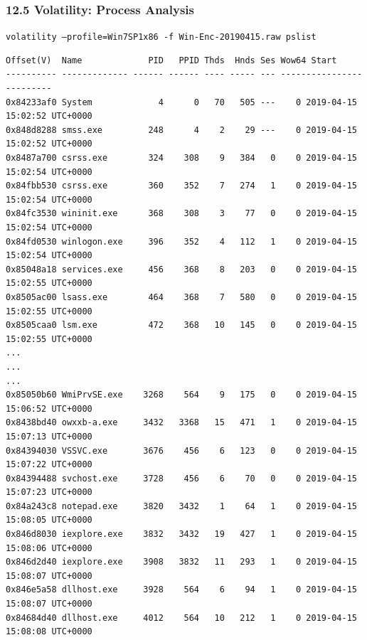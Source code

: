\begin{frame}[fragile]
  \frametitle{12.5 Volatility: Process Analysis}
    \texttt{\footnotesize volatility --profile=Win7SP1x86 -f Win-Enc-20190415.raw pslist}
    \begin{lstlisting}[basicstyle=\tiny]
Offset(V)  Name             PID   PPID Thds  Hnds Ses Wow64 Start          
---------- ------------- ------ ------ ---- ----- --- -------------------------
0x84233af0 System             4      0   70   505 ---    0 2019-04-15 15:02:52 UTC+0000 
0x848d8288 smss.exe         248      4    2    29 ---    0 2019-04-15 15:02:52 UTC+0000
0x8487a700 csrss.exe        324    308    9   384   0    0 2019-04-15 15:02:54 UTC+0000
0x84fbb530 csrss.exe        360    352    7   274   1    0 2019-04-15 15:02:54 UTC+0000
0x84fc3530 wininit.exe      368    308    3    77   0    0 2019-04-15 15:02:54 UTC+0000
0x84fd0530 winlogon.exe     396    352    4   112   1    0 2019-04-15 15:02:54 UTC+0000
0x85048a18 services.exe     456    368    8   203   0    0 2019-04-15 15:02:55 UTC+0000
0x8505ac00 lsass.exe        464    368    7   580   0    0 2019-04-15 15:02:55 UTC+0000
0x8505caa0 lsm.exe          472    368   10   145   0    0 2019-04-15 15:02:55 UTC+0000
...
...
...
0x85050b60 WmiPrvSE.exe    3268    564    9   175   0    0 2019-04-15 15:06:52 UTC+0000
0x8438bd40 owxxb-a.exe     3432   3368   15   471   1    0 2019-04-15 15:07:13 UTC+0000
0x84394030 VSSVC.exe       3676    456    6   123   0    0 2019-04-15 15:07:22 UTC+0000
0x84394488 svchost.exe     3728    456    6    70   0    0 2019-04-15 15:07:23 UTC+0000
0x84a243c8 notepad.exe     3820   3432    1    64   1    0 2019-04-15 15:08:05 UTC+0000
0x846d8030 iexplore.exe    3832   3432   19   427   1    0 2019-04-15 15:08:06 UTC+0000
0x846d2d40 iexplore.exe    3908   3832   11   293   1    0 2019-04-15 15:08:07 UTC+0000
0x846e5a58 dllhost.exe     3928    564    6    94   1    0 2019-04-15 15:08:07 UTC+0000
0x84684d40 dllhost.exe     4012    564   10   212   1    0 2019-04-15 15:08:08 UTC+0000
    \end{lstlisting}
\end{frame}


